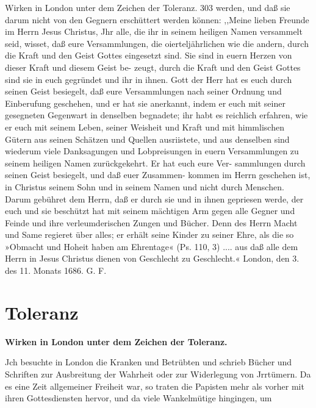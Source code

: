 Wirken in London unter dem Zeichen der Toleranz. 303
werden, und daß sie darum nicht von den Gegnern erschüttert
werden können:
,,Meine lieben Freunde im Herrn Jesus Christus,
Jhr alle, die ihr in seinem heiligen Namen versammelt seid,
wisset, daß eure Versammlungen, die oierteljährlichen wie die
andern, durch die Kraft und den Geist Gottes eingesetzt sind.
Sie sind in euern Herzen von dieser Kraft und diesem Geist be-
zeugt, durch die Kraft und den Geist Gottes sind sie in euch gegründet
und ihr in ihnen. Gott der Herr hat es euch durch seinen Geist
besiegelt, daß eure Versammlungen nach seiner Ordnung und
Einberufung geschehen, und er hat sie anerkannt, indem er euch
mit seiner gesegneten Gegenwart in denselben begnadete; ihr
habt es reichlich erfahren, wie er euch mit seinem Leben, seiner
Weisheit und Kraft und mit himmlischen Gütern aus seinen
Schätzen und Quellen ausriistete, und aus denselben sind wiederum
viele Danksagungen und Lobpreisungen in euern Versammlungen
zu seinem heiligen Namen zurückgekehrt. Er hat euch eure Ver-
sammlungen durch seinen Geist besiegelt, und daß euer Zusammen-
kommen im Herrn geschehen ist, in Christus seinem Sohn und in
seinem Namen und nicht durch Menschen. Darum gebühret dem
Herrn, daß er durch sie und in ihnen gepriesen werde, der euch
und sie beschützt hat mit seinem mächtigen Arm gegen alle Gegner
und Feinde und ihre verleumderischen Zungen und Bücher. Denn
des Herrn Macht und Same regieret über alles; er erhält seine
Kinder zu seiner Ehre, als die so »Obmacht und Hoheit haben
am Ehrentage« (Ps. 110, 3) .... aus daß alle dem Herrn in
Jesus Christus dienen von Geschlecht zu Geschlecht.«
London, den 3. des 11. Monats 1686. G. F.

\chapter[Toleranz]{Toleranz}

\begin{center}
\textbf{Wirken in London unter dem Zeichen der Toleranz.}
\end{center}


Jch besuchte in London die Kranken und Betrübten und
schrieb Bücher und Schriften zur Ausbreitung der Wahrheit oder
zur Widerlegung von Jrrtümern. Da es eine Zeit allgemeiner
Freiheit war, so traten die Papisten mehr als vorher mit ihren
Gottesdiensten hervor, und da viele Wankelmütige hingingen, um



